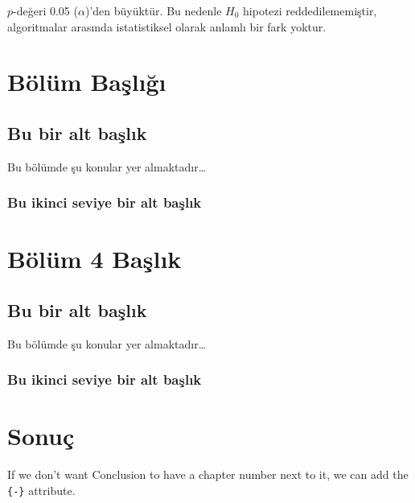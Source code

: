 \documentclass[12pt,twoside]{deuthesis}
\begin{document}
\(p\)-değeri 0.05 (\(\alpha\))'den büyüktür. Bu nedenle \(H_0\) hipotezi reddedilememiştir, algoritmalar arasında istatistiksel olarak anlamlı bir fark yoktur.

\hypertarget{Bolum4}{%
\chapter{Bölüm Başlığı}\label{Bolum4}}

\hypertarget{bu-bir-alt-baux15flux131k}{%
\section{Bu bir alt başlık}\label{bu-bir-alt-baux15flux131k}}

Bu bölümde şu konular yer almaktadır\ldots{}

\hypertarget{bu-ikinci-seviye-bir-alt-baux15flux131k}{%
\subsection{Bu ikinci seviye bir alt başlık}\label{bu-ikinci-seviye-bir-alt-baux15flux131k}}

\hypertarget{Bolum5}{%
\chapter{Bölüm 4 Başlık}\label{Bolum5}}

\hypertarget{bu-bir-alt-baux15flux131k-1}{%
\section{Bu bir alt başlık}\label{bu-bir-alt-baux15flux131k-1}}

Bu bölümde şu konular yer almaktadır\ldots{}

\hypertarget{bu-ikinci-seviye-bir-alt-baux15flux131k-1}{%
\subsection{Bu ikinci seviye bir alt başlık}\label{bu-ikinci-seviye-bir-alt-baux15flux131k-1}}

\hypertarget{sonuuxe7}{%
\chapter*{Sonuç}\label{sonuuxe7}}

If we don't want Conclusion to have a chapter number next to it, we can add the \texttt{\{-\}} attribute.
\end{document}
